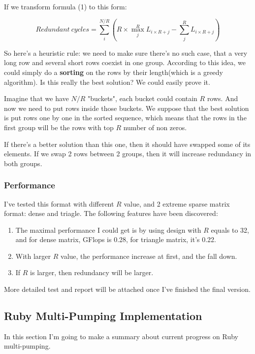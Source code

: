 If we transform formula (1) to this form:

\begin{equation}
Redundant\ cycles = \sum_{i}^{N/R} (R \times \max_{j}^{R} L_{i\times R + j} - \sum_{j}^{R} L_{i \times R + j})
\end{equation}

So here's a heuristic rule: we need to make sure there's no such case, that a very long row and several short rows coexist in one group. According to this idea, we could simply do a \textbf{sorting} on the rows by their length(which is a greedy algorithm). Is this really the best solution? We could easily prove it. 

Imagine that we have $N/R$ "buckets", each bucket could contain $R$ rows. And now we need to put rows inside those buckets. We suppose that the best solution is put rows one by one in the sorted sequence, which means that the rows in the first group will be the rows with top $R$ number of non zeros.

If there's a better solution than this one, then it should have swapped some of its elements. If we swap 2 rows between 2 groups, then it will increase redundancy in both groups.

\subsubsection{Performance}

I've tested this format with different $R$ value, and 2 extreme sparse matrix format: dense and triagle. The following features have been discovered:
\begin{enumerate}
\item The maximal performance I could get is by using design with $R$ equals to 32, and for dense matrix, GFlops is 0.28, for triangle matrix, it's 0.22.
\item With larger $R$ value, the performance increase at first, and the fall down.
\item If $R$ is larger, then redundancy will be larger.
\end{enumerate}

More detailed test and report will be attached once I've finished the final version.

\subsection{Ruby Multi-Pumping Implementation}

In this section I'm going to make a summary about current progress on Ruby multi-pumping. 

